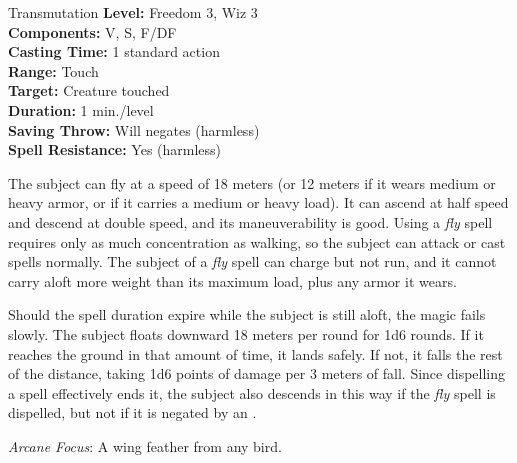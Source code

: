 {Transmutation}
{
	\textbf{Level:}
	Freedom 3, Wiz 3\\
	\textbf{Components:}
	V, S, F/DF\\
	\textbf{Casting Time:}
	1 standard action\\
	\textbf{Range:}
	Touch\\
	\textbf{Target:}
	Creature touched\\
	\textbf{Duration:}
	1 min./level\\
	\textbf{Saving Throw:}
	Will negates (harmless)\\
	\textbf{Spell Resistance:}
	Yes (harmless)\\
}
{
	The subject can fly at a speed of 18 meters (or 12 meters if it wears medium or heavy armor, or if it carries a medium or heavy load). It can ascend at half speed and descend at double speed, and its maneuverability is good. Using a \emph{fly} spell requires only as much concentration as walking, so the subject can attack or cast spells normally. The subject of a \emph{fly} spell can charge but not run, and it cannot carry aloft more weight than its maximum load, plus any armor it wears.

	Should the spell duration expire while the subject is still aloft, the magic fails slowly. The subject floats downward 18 meters per round for 1d6 rounds. If it reaches the ground in that amount of time, it lands safely. If not, it falls the rest of the distance, taking 1d6 points of damage per 3 meters of fall. Since dispelling a spell effectively ends it, the subject also descends in this way if the \emph{fly} spell is dispelled, but not if it is negated by an .

	\textit{Arcane Focus}:
	A wing feather from any bird.

}
